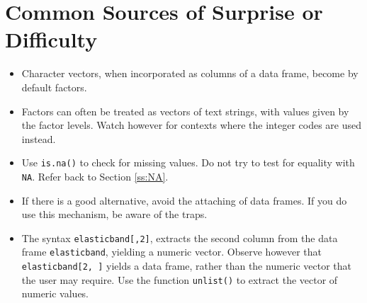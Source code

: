 \documentclass{tufte-book}\usepackage[]{graphicx}\usepackage[]{color}
\newcommand{\txtt}[1]{\texttt{#1}}
\begin{document}
\section{Common Sources of Surprise or Difficulty}\label{sec:difficult}
\begin{itemize}
\item[] Character vectors, when incorporated as columns of a data frame,
become by default factors.

\item[] Factors can often be treated as vectors of text strings, with
values given by the factor levels. Watch however for contexts where
the integer codes are used instead.

\item[] Use \txtt{is.na()} to check for missing values.  Do not try
  to test for equality with \txtt{NA}.  Refer back to Section
  \ref{ss:NA}.

\item[] If there is a good alternative, avoid the attaching of data
  frames.   If you do use this mechanism, be aware of the traps.

\item[] The syntax \txtt{elasticband[,2]}, extracts the second
  column from the data frame \txtt{elasticband}, yielding a numeric
  vector.  Observe however that \txtt{elasticband[2, ]} yields a
  data frame, rather than the numeric vector that the user may
  require.  Use the function \txtt{unlist()} to extract the vector
of numeric values.
\end{itemize}
\end{document}

